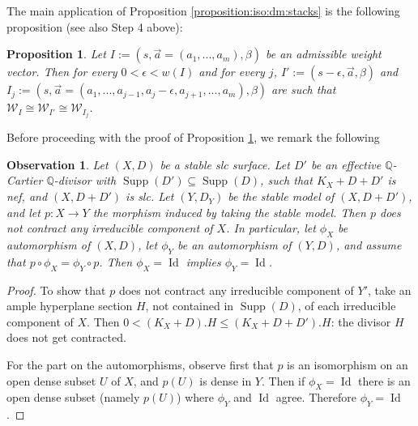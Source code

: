 \documentclass[11pt]{amsart}
\newcommand{\cE}{\mathcal{W}}
\newcommand{\supp}{\operatorname{Supp}}
\newcommand{\Id}{\operatorname{Id}}
\newtheorem{Oss}[theorem]{Observation}
\newtheorem{Prop}[theorem]{Proposition}
\theoremstyle{definition}
\begin{document}
 The main application of Proposition \ref{proposition:iso:dm:stacks} is the following proposition (see also Step 4 above):
\begin{Prop}\label{Prop:iso:se:riduco:s}
 Let $I:=(s,\vec{a}=(a_1,...,a_m),\beta)$ be an admissible weight vector. Then for every $0<\epsilon<w(I)$ and for every $j$,
 $I':=(s-\epsilon,\vec{a},\beta)$ and $I_j:=(s,\vec{a}=(a_1,...,a_{j-1},a_j-\epsilon,a_{j+1},...,a_m),\beta)$
 are such that $\mathcal{W}_{I} \cong \cE_{I'}\cong \cE_{I_j}$.
\end{Prop}
Before proceeding with the proof of Proposition \ref{Prop:iso:se:riduco:s}, we remark the following
\begin{Oss}\label{Oss:automorphism}
Let $(X,D)$ be a stable slc surface. Let $D'$ be an effective $\mathbb{Q}$-Cartier $\mathbb{Q}$-divisor with $\supp(D') \subseteq \supp(D)$, such that $K_{X}+D+ D'$ is nef, and $(X,D+D')$ is slc. Let $(Y,D_Y)$ be the stable model of $(X,D+D')$, and let $p:X \to Y$ the morphism induced by taking the stable model. Then $p$ does not contract any irreducible component of $X$. In particular, let $\phi_X$ be automorphism  of $(X,D)$, let $\phi_Y$ be an automorphism of $(Y,D)$, and assume that $p \circ \phi_X=\phi_Y \circ p$. Then $\phi_X=\Id$ implies $\phi_Y=\Id$.  
\end{Oss}
\begin{proof}
To show that $p$ does not contract any irreducible component of $Y'$, take an ample hyperplane section $H$, not contained in $\supp(D)$, of each irreducible component of $X$. Then $0<(K_X+D).H\le (K_X+D+D').H$: the divisor $H$ does not get contracted.

For the part on the automorphisms, observe first that $p$ is an isomorphism on an open dense subset $U$ of $X$, and $p(U)$ is dense in $Y$. Then if $\phi_X=\Id$ there is an open dense subset (namely $p(U)$) where $\phi_Y$ and $\Id$ agree. Therefore $\phi_Y=\Id$.\end{proof}
\end{document}
